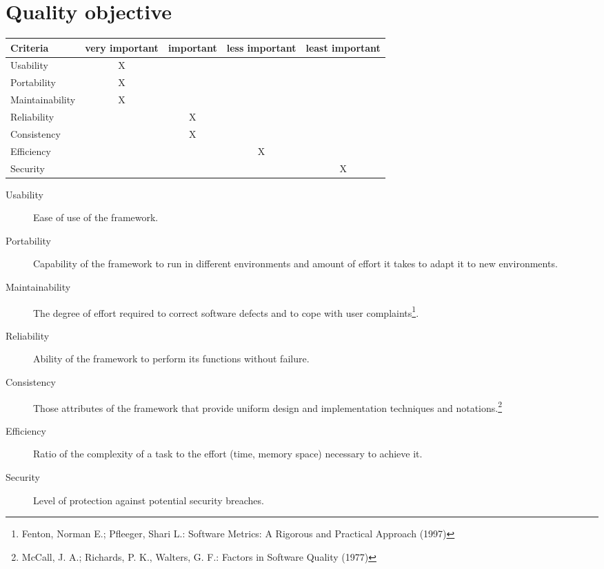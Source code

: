 \section{Quality objective}

\begin{tabular}{lcccc}
\hline
\textbf{Criteria} & \textbf{very important} & \textbf{important} & \textbf{less important} & \textbf{least important} \\
\hline
Usability & X & & & \\
Portability & X & & & \\
Maintainability & X & & & \\
Reliability & & X & & \\
Consistency & & X & & \\
Efficiency & & & X & \\
Security & & & & X \\
\hline

\end{tabular}


\begin{description}
	\item[Usability] Ease of use of the framework.
	\item[Portability] Capability of the framework to run in different environments and amount of effort it takes to adapt it to new environments.
	\item[Maintainability] The degree of effort required to correct software defects and to cope with user complaints\footnote{Fenton, Norman E.; Pfleeger, Shari L.: Software Metrics: A Rigorous and Practical Approach (1997)}.
	\item[Reliability] Ability of the framework to perform its functions without failure.
	\item[Consistency] Those attributes of the framework that provide uniform design and implementation techniques and notations.\footnote{McCall, J. A.; Richards, P. K., Walters, G. F.: Factors in Software Quality (1977)}
	\item[Efficiency] Ratio of the complexity of a task to the effort (time, memory space) necessary to achieve it.
	\item[Security] Level of protection against potential security breaches.
	
\end{description}